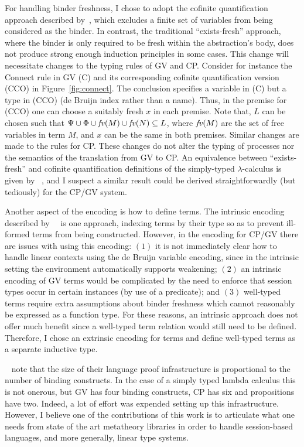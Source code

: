 For handling binder freshness, I chose to adopt the cofinite quantification
approach described by~\citeauthor{Aydemir:2008:EFM}, which excludes a finite
set of variables from being considered as the binder. In contrast, the
traditional ``exists-fresh'' approach, where the binder is only required to be
fresh within the abstraction's body, does not produce strong enough induction
principles in some cases. This change will necessitate changes to the typing
rules of GV and CP. Consider for instance the Connect rule in GV (C) and its
corresponding cofinite quantification version (CCO) in
Figure~\ref{fig:connect}. The conclusion specifies a variable in (C) but a
type in (CCO) (de Bruijn index rather than a name). Thus, in the premise for
(CCO) one can choose a suitably fresh $x$ in each premise. Note that, $L$ can
be chosen such that $\Psi \cup \Phi \cup \mathit{fv}(M) \cup \mathit{fv}(N) \subseteq L$,
where $\mathit{fv}(M)$ are the set of free variables in term $M$, and $x$ can be the
same in both premises. Similar changes are made to the rules for CP. These
changes do not alter the typing of processes nor the semantics of the
translation from GV to CP. An equivalence between ``exists-fresh'' and
cofinite quantification definitions of the simply-typed $\lambda$-calculus is
given by \citeauthor{Aydemir:2008:EFM}~\cite{Aydemir:2008:EFM}, and I suspect
a similar result could be derived straightforwardly (but tediously) for the
CP/GV system.

Another aspect of the encoding is how to define terms. The intrinsic encoding
described by~\citeauthor{Benton:2012:STT}~\cite{Benton:2012:STT} is one
approach, indexing terms by their type so as to prevent ill-formed terms from
being constructed. However, in the encoding for CP/GV there are issues with
using this encoding: $(1)$ it is not immediately clear how to handle linear
contexts using the de Bruijn variable encoding, since in the intrinsic setting
the environment automatically supports weakening; $(2)$ an intrinsic encoding
of GV terms would be complicated by the need to enforce that session types
occur in certain instances (by use of a predicate); and $(3)$ well-typed terms
require extra assumptions about binder freshness which cannot reasonably be
expressed as a function type. For these reasons, an intrinsic approach does
not offer much benefit since a well-typed term relation would still need to be
defined. Therefore, I chose an extrinsic encoding for terms and define
well-typed terms as a separate inductive type.

\citeauthor{Aydemir:2008:EFM}~\cite{Aydemir:2008:EFM} note that the size of
their language proof infrastructure is proportional to the number of binding
constructs. In the case of a simply typed lambda calculus this is not onerous,
but GV has four binding constructs, CP has six and propositions have
two. Indeed, a lot of effort was expended setting up this
infrastructure. However, I believe one of the contributions of this work is to
articulate what one needs from state of the art metatheory libraries in order
to handle session-based languages, and more generally, linear type systems.

